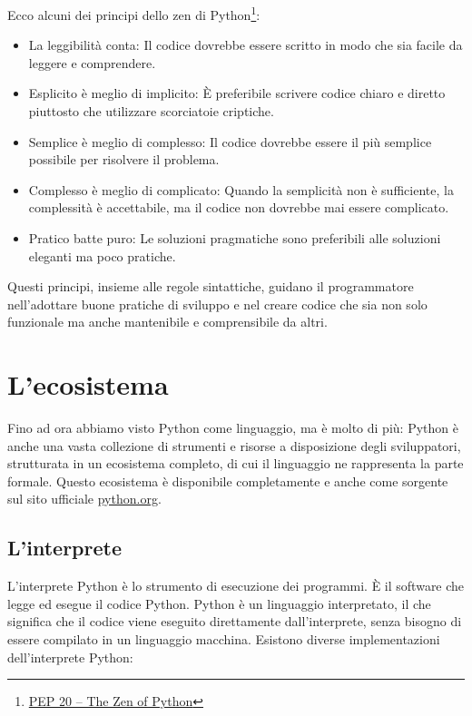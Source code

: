 \documentclass[
  letterpaper,
  DIV=11,
  numbers=noendperiod]{scrreprt}
\providecommand{\tightlist}{%
  \setlength{\itemsep}{0pt}\setlength{\parskip}{0pt}}\usepackage{longtable,booktabs,array}
\begin{document}
Ecco alcuni dei principi dello zen di Python\footnote{\href{https://peps.python.org/pep-0020/}{PEP
  20 -- The Zen of Python}}:

\begin{itemize}
\tightlist
\item
  La leggibilità conta: Il codice dovrebbe essere scritto in modo che
  sia facile da leggere e comprendere.
\item
  Esplicito è meglio di implicito: È preferibile scrivere codice chiaro
  e diretto piuttosto che utilizzare scorciatoie criptiche.
\item
  Semplice è meglio di complesso: Il codice dovrebbe essere il più
  semplice possibile per risolvere il problema.
\item
  Complesso è meglio di complicato: Quando la semplicità non è
  sufficiente, la complessità è accettabile, ma il codice non dovrebbe
  mai essere complicato.
\item
  Pratico batte puro: Le soluzioni pragmatiche sono preferibili alle
  soluzioni eleganti ma poco pratiche.
\end{itemize}

Questi principi, insieme alle regole sintattiche, guidano il
programmatore nell'adottare buone pratiche di sviluppo e nel creare
codice che sia non solo funzionale ma anche mantenibile e comprensibile
da altri.

\section{L'ecosistema}\label{lecosistema}

Fino ad ora abbiamo visto Python come linguaggio, ma è molto di più:
Python è anche una vasta collezione di strumenti e risorse a
disposizione degli sviluppatori, strutturata in un ecosistema completo,
di cui il linguaggio ne rappresenta la parte formale. Questo ecosistema
è disponibile completamente e anche come sorgente sul sito ufficiale
\href{https://www.python.org/}{python.org}.

\subsection{L'interprete}\label{linterprete}

L'interprete Python è lo strumento di esecuzione dei programmi. È il
software che legge ed esegue il codice Python. Python è un linguaggio
interpretato, il che significa che il codice viene eseguito direttamente
dall'interprete, senza bisogno di essere compilato in un linguaggio
macchina. Esistono diverse implementazioni dell'interprete Python:
\end{document}
